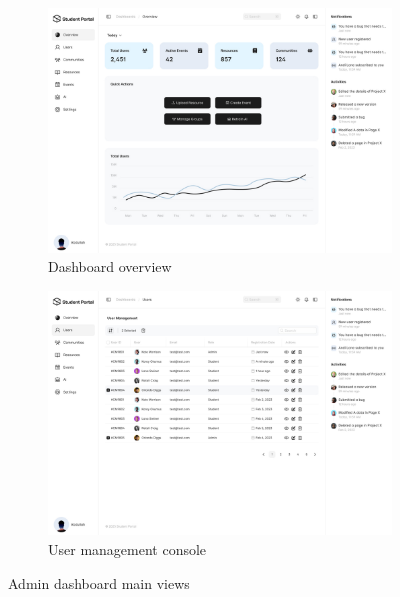 \begin{figure}[H]
    \centering
    \begin{subfigure}{0.45\textwidth}
        \includegraphics[width=\textwidth]{images/web_interface/Overview.jpg}
        \caption{Dashboard overview}
        \label{fig:overview}
    \end{subfigure}
    \begin{subfigure}{0.45\textwidth}
        \includegraphics[width=\textwidth]{images/web_interface/User-Management.jpg}
        \caption{User management console}
        \label{fig:user_mgmt}
    \end{subfigure}
    \caption{Admin dashboard main views}
    \label{fig:admin_main}
\end{figure}

